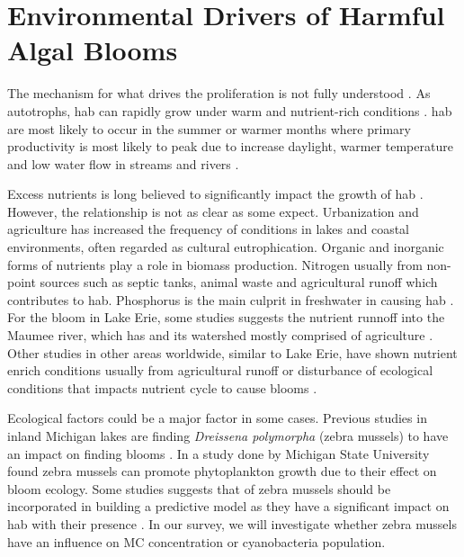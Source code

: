 \section{Environmental Drivers of Harmful Algal Blooms}
The mechanism for what drives the proliferation is not fully understood \cite{dittmann_cyanobacterial_2012}. As autotrophs, \gls{hab} can rapidly grow under warm and nutrient-rich conditions \cite{rastogi_cyanotoxin-microcystins:_2014}. \gls{hab} are most likely to occur in the summer or warmer months where primary productivity is most likely to peak due to increase daylight, warmer temperature and low water flow in streams and rivers \cite{vannote_river_1980,chapra_climate_2017-2}.

Excess nutrients is long believed to significantly impact the growth of \gls{hab} \cite{anderson_harmful_2002,anderson_harmful_2002}. However, the relationship is not as clear as some expect. Urbanization and agriculture has increased the frequency of  conditions in lakes and coastal environments, often regarded as cultural eutrophication\cite{smith_eutrophication_2009}.  Organic and inorganic forms of nutrients  play a role in biomass production. Nitrogen usually from non-point sources such as septic tanks, animal waste and agricultural runoff which contributes to \gls{hab}. Phosphorus is the main culprit in freshwater in causing \gls{hab} \cite{anderson_harmful_2002}. For the bloom in Lake Erie, some studies suggests the nutrient runnoff into the  Maumee river, which has and its watershed mostly comprised of agriculture \cite{michalak_record-setting_2013, chaffin_accuracy_2018}. Other studies in other areas worldwide, similar to Lake Erie, have shown nutrient enrich conditions usually from agricultural runoff or disturbance of ecological conditions that impacts nutrient cycle to cause blooms \cite{ahn_evaluation_2011, ahn_rainfall_2002, anderson_harmful_2002, jiang_statistical_2008}.

Ecological factors could be a major factor in some cases. Previous studies in inland Michigan lakes are finding \emph{Dreissena polymorpha} (zebra mussels) to have an impact on finding blooms \cite{vanderploeg_zebra_2001}. In a study done by Michigan State University \cite{raikow_dominance_2004} found zebra mussels can promote phytoplankton growth due to their effect on bloom ecology. Some studies suggests that of zebra mussels should be incorporated in building a predictive model as they have a significant impact on \gls{hab} with their presence \cite{lavrentyev_effects_1995, knoll_invasive_2008, raikow_dominance_2004}. In our survey, we will investigate whether zebra mussels have an influence on MC concentration or cyanobacteria population.

